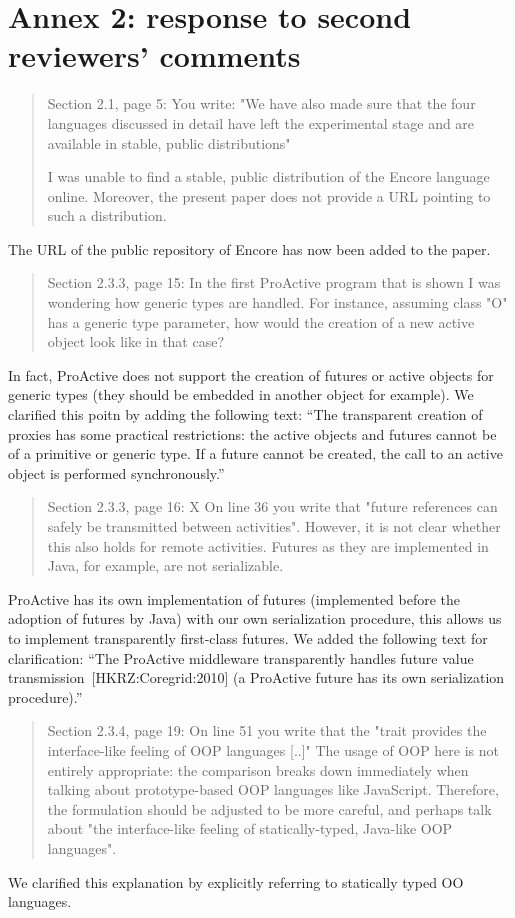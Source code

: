 \documentclass{article}
\begin{document}
\section*{Annex 2: response to second reviewers' comments}


\begin{quote}
	Section 2.1, page 5:
You write: "We have also made sure that the four languages discussed in detail have left 
the experimental stage and are available in stable, public distributions"

I was unable to find a stable, public distribution of the Encore language online. 
Moreover, the present paper does not provide a URL pointing to such a distribution.
\end{quote}
The URL of the public repository of Encore has now been added to the paper.

\begin{quote}
	Section 2.3.3, page 15:
In the first ProActive program that is shown I was wondering how generic types are 
handled. For instance, assuming class "O" has a generic type parameter, how would the 
creation of a new active object look like in that case?
\end{quote}
In fact, ProActive does not support the creation of futures or active objects for generic 
types (they should be embedded in another object for example). We clarified this poitn by 
adding the following text: ``The transparent creation of proxies has some
practical restrictions: the active objects and futures cannot be of a
primitive or generic type. If a future cannot be created, the call to
an active object is performed synchronously.''

\begin{quote}
	Section 2.3.3, page 16:
X On line 36 you write that "future references can safely be transmitted between 
activities". However, it is not clear whether this also holds for remote activities. 
Futures as they are implemented in Java, for example, are not serializable.
\end{quote}
ProActive has its own implementation of futures (implemented before the adoption of 
futures by Java) with our own serialization procedure, this allows us to implement 
transparently first-class futures. We added the following text for clarification:
``The ProActive middleware transparently handles future value
transmission~[HKRZ:Coregrid:2010] (a ProActive future has its own serialization 
procedure).''

\begin{quote}
	Section 2.3.4, page 19:
On line 51 you write that the "trait provides the interface-like feeling of OOP languages 
[..]" The usage of OOP here is not entirely appropriate: the comparison breaks down 
immediately when talking about prototype-based OOP languages like JavaScript. Therefore, 
the formulation should be adjusted to be more careful, and perhaps talk about "the 
interface-like feeling of statically-typed, Java-like OOP languages".
\end{quote}
We clarified this explanation by explicitly referring to statically typed OO languages.
\end{document}
